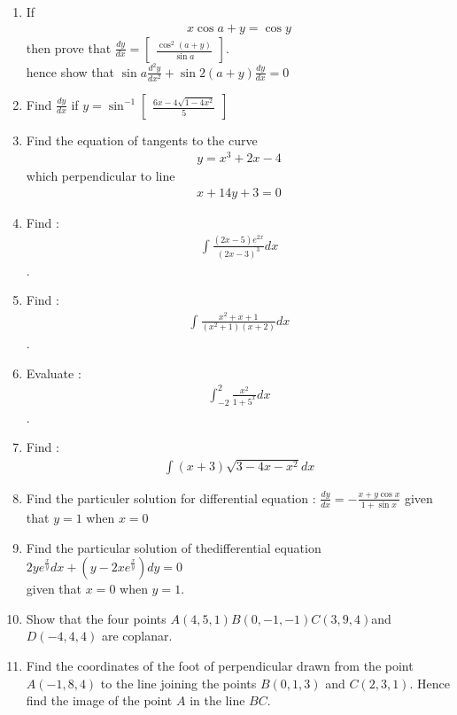 \documentclass[12pt,-letter paper]{article}
\providecommand{\myvec}[1]{\ensuremath{\begin{bmatrix}#1\end{bmatrix}}}
\providecommand{\brak}[1]{\ensuremath{\left(#1\right)}}
\begin{document}
\begin{enumerate}
\item If \begin{align}x\cos{a+y}=\cos{y}\end{align} then prove that $\frac{dy}{dx}=\myvec{\frac{\cos^2\brak{a+y}}{\sin a}}$.\\
hence show that $\sin a\frac{d^{2}y}{dx^2}+\sin 2\brak{a+y}\frac{dy}{dx}=0$

\item	Find $\frac{dy}{dx}$ if $y=\sin^{-1}\myvec{\frac{6x-4\sqrt{1-4x^2}}{5}}$
\item Find the equation of tangents to the curve\begin{align}y=x ^ 3 + 2x - 4\end{align}which perpendicular to line \begin{align}x + 14y + 3 = 0\end{align}
\item Find : \begin{align}\int\frac{\brak{2x-5}e^{2x}}{\brak{2x-3}^3}dx\end{align}.
	\item	Find :\begin{align}\int\frac{x^2+x+1}{\brak{x^{2}+1}\brak{x+2}}dx\end{align}.
\item Evaluate :\begin{align}\int_{-2}^{2}\frac{x^2}{1+5^x}dx\end{align}.
\item Find :\begin{align}\int{\brak{x+3}\sqrt{3-4x-x^2}}dx\end{align}
	
\item Find the particuler solution for differential equation : $\frac{dy}{dx}=-\frac{x+y\cos x}{1+\sin x}$ given that $y=1$ when $x=0$
	
	\item Find the particular solution of thedifferential equation $2ye^\frac{x}{y}dx+\brak{y-2xe^\frac{x}{y}}dy=0$\\given that $x=0$ when $y=1$.
	
	\item Show that the four points $A\brak{4, 5, 1} B\brak{0, -1, -1} C\brak{3, 9, 4}$and $D\brak{-4, 4, 4}$ are coplanar.
    
	\item Find the coordinates of the foot of perpendicular drawn from the point $A\brak{-1, 8, 4}$ to the line joining the points $B\brak{0, 1, 3}$ and $C\brak{2,3,1}$. Hence find the image of the point $A$ in the line $BC$.
    

\end{enumerate}
\end{document}
